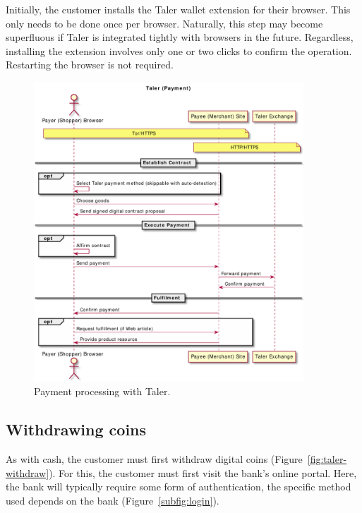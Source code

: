 \documentclass{llncs}
\begin{document}
Initially, the customer installs the Taler wallet extension for
their browser.  This only needs to be done once per
browser. Naturally, this step may become superfluous if Taler is
integrated tightly with browsers in the future.  Regardless,
installing the extension involves only one or two clicks to confirm the
operation. Restarting the browser is not required.


\begin{figure}[t!]
\includegraphics[width=0.9\textwidth]{figs/taler-pay.pdf}
\caption{Payment processing with Taler.}
\label{fig:taler-pay}
\end{figure}


\subsection{Withdrawing coins}

As with cash, the customer must first withdraw digital coins
(Figure~\ref{fig:taler-withdraw}).  For this, the customer must first
visit the bank's online portal.  Here, the bank will
typically require some form of authentication, the specific method
used depends on the bank (Figure~\ref{subfig:login}).
\end{document}
